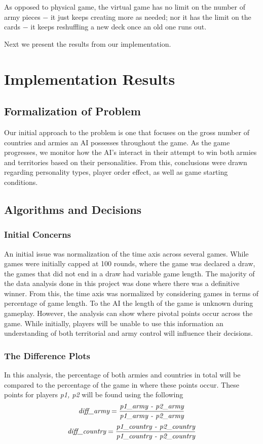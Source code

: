 \documentclass[12pt]{article}  %
\begin{document}
As opposed to physical game, the virtual game has no limit on the number of army pieces $-$ it just keeps creating more as needed; nor it has the limit on the cards $-$ it keeps reshuffling a new deck once an old one runs out.


Next we present the results from our implementation.

\section{Implementation Results}

\subsection{Formalization of Problem}
Our initial approach to the problem is one that focuses on the gross number of countries and armies an AI possesses throughout the game. As the game progresses, we monitor how the AI’s interact in their attempt to win both armies and territories based on their personalities. From this, conclusions were drawn regarding personality types, player order effect, as well as game starting conditions. 


\subsection{Algorithms and Decisions}

\subsubsection{Initial Concerns}
An initial issue was normalization of the time axis across several games. While games were initially capped at 100 rounds, where the game was declared a draw, the games that did not end in a draw had variable game length. The majority of the data analysis done in this project was done where there was a definitive winner. From this, the time axis was normalized by considering games in terms of percentage of game length. To the AI the length of the game is unknown during gameplay. However, the analysis can show where pivotal points occur across the game. While initially, players will be unable to use this information an understanding of both territorial and army control will influence their decisions.


\subsubsection{The Difference Plots}
In this analysis, the percentage of both armies and countries in total will be compared to the percentage of the game in where these points occur. These points for players \emph{p1, p2} will be found using the following 
$$\emph{diff\_army} = \frac{\emph{p1\_army - p2\_army}}{\emph{p1\_army - p2\_army}}$$
$$\emph{diff\_country} = \frac{\emph{p1\_country - p2\_country}}{\emph{p1\_country - p2\_country}}$$
\end{document}
